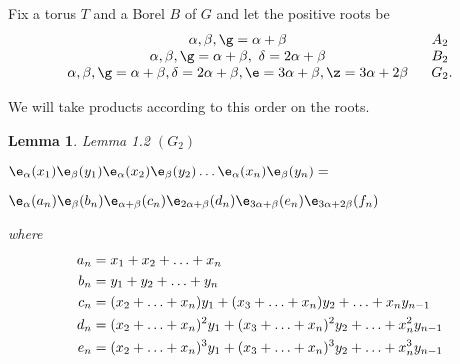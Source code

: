 \documentclass{memo-l}
\newtheorem{lemma}[theorem]{Lemma}
\theoremstyle{definition}
\theoremstyle{remark}
\numberwithin{section}{chapter}
\numberwithin{equation}{chapter}
\begin{document}
   Fix a torus $T$ and a Borel $B$ of $G$ and let the positive roots be
$$
\begin{matrix} 
{\alpha}, {\beta}, {\g} = {\alpha}+{\beta}  &\ \  A_{2}\phantom{.} \\
{\alpha}, {\beta}, {\g} = {\alpha}+{\beta},\ {\delta} = 2{\alpha}+{\beta} 
&\ \  B_{2}\phantom{.} \\
{\alpha}, {\beta}, {\g} = {\alpha}+{\beta}, {\delta} = 2{\alpha}+{\beta}, 
{\e} = 3{\alpha}+{\beta}, {\z} = 3{\alpha}+2{\beta} &\ \ G_{2}.
\end{matrix}
$$

We will take products according to this order on the roots.

\medskip

\begin{lemma}{Lemma 1.2}   $(G_{2})$

${\e}_{\alpha}(x_{1}){\e}_{\beta}(y_{1}){\e}_{\alpha}
(x_{2}){\e}_{\beta}(y_{2})\ldots 
{\e}_{\alpha}(x_{n}){\e}_{\beta}(y_{n}) = $

${\e}_{\alpha}(a_{n}){\e}_{\beta}(b_{n}){\e}_{{\alpha} + 
{\beta}}(c_{n}){\e}_{2{\alpha}+{\beta}}(d_{n}){\e}_{3{\alpha} + 
{\beta}}(e_{n}){\e}_{3{\alpha}+2{\beta}}(f_{n})$

\noindent
where
$$
\aligned
a_{n} &= x_{1} + x_{2} +\ldots + x_{n} \\
b_{n} &= y_{1} + y_{2} +\ldots + y_{n} \\
c_{n} &= (x_{2}+\ldots +x_{n})y_{1} + (x_{3}+\ldots +x_{n})y_{2} + \ldots + 
x_{n}y_{n-1}\\
d_{n} &= (x_{2}+\ldots +x_{n})^{2}y_{1} + (x_{3}+\ldots +x_{n})^{2}y_{2} + 
\ldots + x_{n}^{2}y_{n-1}\\
e_{n} &= (x_{2}+\ldots +x_{n})^{3}y_{1} + (x_{3}+\ldots +x_{n})^{3}y_{2} + 
\ldots + x_{n}^{3}y_{n-1}
\endaligned
$$
\end{lemma}
\end{document}
